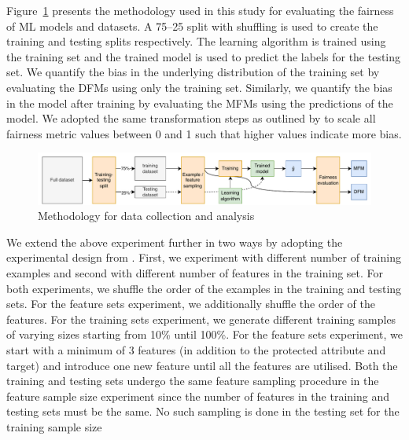 \documentclass{article}
\begin{document}
Figure \ref{fig:method} presents the methodology used in this study
for evaluating the fairness of ML models and datasets. A 75--25 split
with shuffling is used to create the training and testing splits
respectively. The learning algorithm is trained using the training set
and the trained model is used to predict the labels for the testing
set. We quantify the bias in the underlying distribution of the
training set by evaluating the DFMs using only the training
set. Similarly, we quantify the bias in the model after training by
evaluating the MFMs using the predictions of the model. We adopted the
same transformation steps as outlined by
\citeauthor{zhang2021ignorance} to scale all fairness metric values
between 0 and 1 such that higher values indicate more bias.

\begin{figure}
  \centering
  \includegraphics[width=0.95\linewidth]{method.pdf}
  \caption{Methodology for data collection and analysis}
  \label{fig:method}
\end{figure}

We extend the above experiment further in two ways by adopting the
experimental design from \citeauthor{zhang2021ignorance}. First, we
experiment with different number of training examples and second with
different number of features in the training set. For both
experiments, we shuffle the order of the examples in the training and
testing sets. For the feature sets experiment, we additionally shuffle
the order of the features. For the training sets experiment, we
generate different training samples of varying sizes starting from
10\% until 100\%. For the feature sets experiment, we start with a
minimum of 3 features (in addition to the protected attribute and
target) and introduce one new feature until all the features are
utilised. Both the training and testing sets undergo the same feature
sampling procedure in the feature sample size experiment since the
number of features in the training and testing sets must be the same.
No such sampling is done in the testing set for the training sample
size
\end{document}
